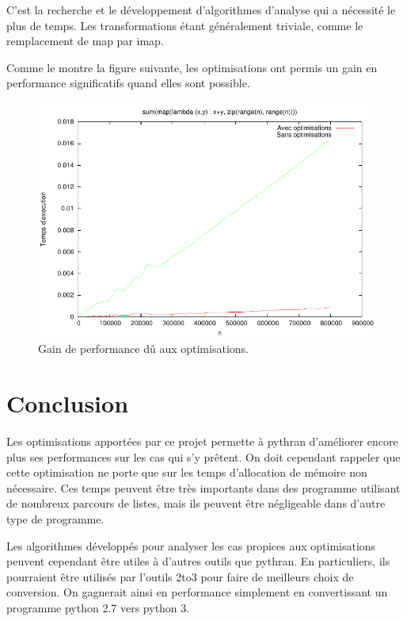 \documentclass[a4paper]{article}
\begin{document}
C'est la recherche et le développement d'algorithmes d'analyse qui a
nécessité le plus de temps. Les transformations étant généralement
triviale, comme le remplacement de map par imap.

Comme le montre la figure suivante, les optimisations ont permis un
gain en performance significatifs quand elles sont possible.

\begin{figure}[h]
  \includegraphics[width=\textwidth]{perf_optimization}
  \caption{Gain de performance dû aux optimisations.}
\end{figure}


\section*{Conclusion}

Les optimisations apportées par ce projet permette à pythran
d'améliorer encore plus ses performances sur les cas qui s'y
prêtent. On doit cependant rappeler que cette optimisation ne porte
que sur les temps d'allocation de mémoire non nécessaire. Ces temps
peuvent être très importants dans des programme utilisant de nombreux
parcours de listes, mais ils peuvent être négligeable dans d'autre
type de programme.

Les algorithmes développés pour analyser les cas propices aux
optimisations peuvent cependant être utiles à d'autres outils que
pythran. En particuliers, ils pourraient être utilisés par l'outils
2to3 pour faire de meilleurs choix de conversion. On gagnerait ainsi
en performance simplement en convertissant un programme python 2.7
vers python 3.
\end{document}

